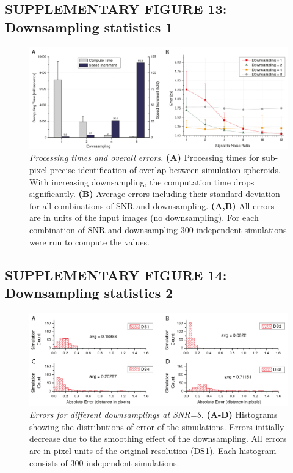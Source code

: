 \documentclass[]{spie}  %
\begin{document}
\subsection*{SUPPLEMENTARY FIGURE 13: Downsampling statistics 1}
\vspace{1mm}
\begin{figure}[h!]
\includegraphics[width=\textwidth]{fig-downsampling-statistics-0.png}
\vspace{-2.0mm}
\caption{\hspace{-0.5mm} \emph{Processing times and overall errors.} \textbf{(A)} Processing times for sub-pixel precise identification of overlap between simulation spheroids. With increasing downsampling, the computation time drops significantly. \textbf{(B)} Average errors including their standard deviation for all combinations of SNR and downsampling. \textbf{(A,B)} All errors are in units of the input images (no downsampling). For each combination of SNR and downsampling 300 independent simulations were run to compute the values.
}
\label{fig:sup-fig-downsampling-statistics-0}
\end{figure}

\subsection*{SUPPLEMENTARY FIGURE 14: Downsampling statistics 2}
\vspace{1mm}
\begin{figure}[h!]
\includegraphics[width=\textwidth]{fig-downsampling-statistics-1.png}
\vspace{-2.0mm}
\caption{\hspace{-0.5mm} \emph{Errors for different downsamplings at SNR=8.} \textbf{(A-D)} Histograms showing the distributions of error of the simulations. Errors initially decrease due to the smoothing effect of the downsampling. All errors are in pixel units of the original resolution (DS1). Each histogram consists of 300 independent simulations.
}
\label{fig:sup-fig-downsampling-statistics-1}
\end{figure}
\end{document}
